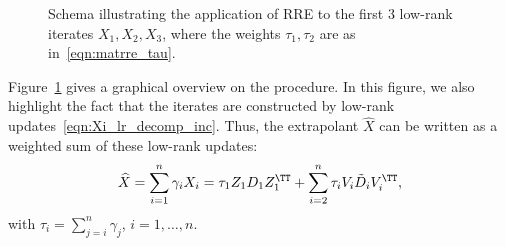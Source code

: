 \begin{figure}[t]
	\centering
	\resizebox{\linewidth}{!}{}
	\caption{%
		Schema illustrating the application of \ac{RRE} to the first 3 low-rank
		iterates $X_1, X_2, X_3$,
		where the weights $\tau_1, \tau_2$ are as in~\eqref{eqn:matrre_tau}.
	}%
	\label{fig:lowrank_rre}
\end{figure}

Figure~\ref{fig:lowrank_rre} gives a graphical overview on the procedure.
In this figure, we also highlight the fact that the iterates are constructed by low-rank updates~\eqref{eqn:Xi_lr_decomp_inc}.
Thus, the extrapolant $\widehat{X}$ can be written as a weighted sum of these low-rank updates:
\begin{equation}
	\widehat{X}
	= \sum_{i=1}^{n} \gamma_i X_i
	= \tau_1 Z_1 D_1 Z_1^\TT + \sum_{i=2}^{n} \tau_i V_i \tilde D_i V_i^\TT,
	\label{eqn:matrre_tau}
\end{equation}
with $\tau_i = \sum_{j=i}^{n} \gamma_j$, $i = 1, \ldots, n$.

